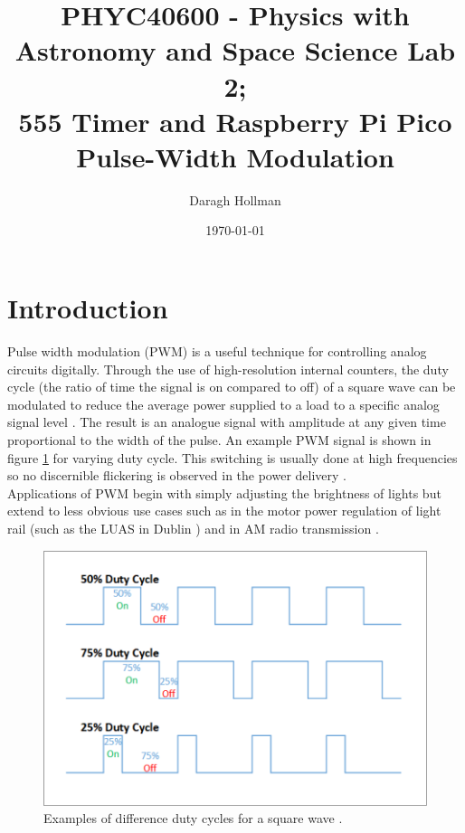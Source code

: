 \documentclass[%
 reprint,
 amsmath,amssymb,
 aps,
]{revtex4-2}
\begin{document}

\title{PHYC40600 - Physics with Astronomy and Space Science Lab 2;\\\vspace{1cm}555 Timer and Raspberry Pi Pico Pulse-Width Modulation}

\author{Daragh Hollman}
%

\date{\today}%

\begin{abstract}
\end{abstract}

\maketitle

\section{Introduction}

    Pulse width modulation (PWM) is a useful technique for controlling analog circuits digitally. Through the use of high-resolution internal counters, the duty cycle (the ratio of time the signal is on compared to off) of a square wave can be modulated to reduce the average power supplied to a load to a specific analog signal level \cite{barr}. The result is an analogue signal with amplitude at any given time proportional to the width of the pulse. An example PWM signal is shown in figure \ref{fig:PWM} for varying duty cycle. This switching is usually done at high frequencies so no discernible flickering is observed in the power delivery \cite{ucd}.\\

    Applications of PWM begin with simply adjusting the brightness of lights but extend to less obvious use cases such as in the motor power regulation of light rail (such as the LUAS in Dublin \cite{ucd}) and in AM radio transmission \cite{radioworld}.\\

    \begin{figure}
        \includegraphics[width=0.9\columnwidth]{Images/pwm.png}
        \caption{\label{fig:PWM}Examples of difference duty cycles for a square wave \cite{ucd}.}
    \end{figure}
\end{document}
